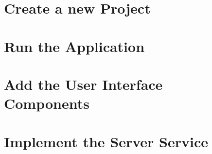 \documentclass{article}
\begin{document}
\section{Create a new Project}

\section{Run the Application}

\section{Add the User Interface Components}

\section{Implement the Server Service}

\end{document}
